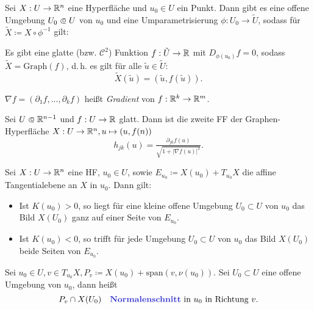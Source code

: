 \documentclass{cheat-sheet}
\newcommand{\Graph}{\mathrm{Graph}}
\newcommand{\Span}{\mathrm{span}}
\begin{document}


\begin{satz}
  Sei $X : U \to \mathbb{R}^n$ eine Hyperfläche und $u_0 \in U$ ein Punkt. Dann gibt es eine offene Umgebung $U_0 \opn U$ von $u_0$ und eine Umparametrisierung $\phi : U_0 \to \tilde{U}$, sodass für $\tilde{X} \coloneqq X \circ \phi^{-1}$ gilt:

  Es gibt eine glatte (bzw. $\mathcal{C}^2$) Funktion $f : \tilde{U} \to \mathbb{R}$ mit $D_{\phi(u_0)} f = 0$, sodass $\tilde{X} = \Graph(f)$, d.\,h. es gilt für alle $\tilde{u} \in \tilde{U}$:
  \[ \tilde{X}(\tilde{u}) = (\tilde{u}, f(\tilde{u})). \]
\end{satz}

\begin{nota}
  $\nabla f = (\partial_1 f, ..., \partial_k f)$ heißt \emph{Gradient} von $f : \mathbb{R}^k \to \mathbb{R}^m$.
\end{nota}

\begin{satz}
  Sei $U \opn \R^{n-1}$ und $f : U \to \mathbb{R}$ glatt. Dann ist die zweite FF der Graphen-Hyperfläche $X : U \to \mathbb{R}^n, u \mapsto (u, f(n))$
  \[ h_{jk}(u) = \tfrac{\partial_{jk} f(u)}{\sqrt{1 + |\nabla f(u)|^2}}. \]
\end{satz}

\begin{satz}
  Sei $X : U \to \mathbb{R}^n$ eine HF, $u_0 \in U$, sowie $E_{u_0} \coloneqq X(u_0) + T_{u_0} X$ die affine Tangentialebene an $X$ in $u_0$. Dann gilt:
  \begin{itemize}
    \item Ist $K(u_0) > 0$, so liegt für eine kleine offene Umgebung $U_0 \subset U$ von $u_0$ das Bild $X(U_0)$ ganz auf einer Seite von $E_{u_0}$.
    \item Ist $K(u_0) < 0$, so trifft für jede Umgebung $U_0 \subset U$ von $u_0$ das Bild $X(U_0)$ beide Seiten von $E_{u_0}$.
  \end{itemize}
\end{satz}




\begin{defn}
  Sei $u_0 \in U, v \in T_{u_0} X, P_v \coloneqq X(u_0) + \Span(v, \nu(u_0))$.
  Sei $U_0 \subset U$ eine offene Umgebung von $u_0$, dann heißt
  \[
    P_v \cap X(U_0)
    \quad \text{\emph{Normalenschnitt} in $u_0$ in Richtung $v$.}
  \]
\end{defn}
\end{document}
